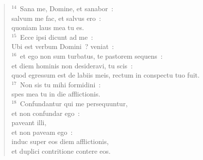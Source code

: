 \begin{flushleft}
\begin{verse}
${}^{14}$~Sana me, Domine, et sanabor~:\\ salvum me fac, et salvus ero~:\\ quoniam laus mea tu es.\\
${}^{15}$~Ecce ipsi dicunt ad me~:\\ Ubi est verbum Domini~? veniat~:\\
${}^{16}$~et ego non sum turbatus, te pastorem sequens~:\\ et diem hominis non desideravi, tu scis~:\\ quod egressum est de labiis meis, rectum in conspectu tuo fuit.\\
${}^{17}$~Non sis tu mihi formidini~:\\ spes mea tu in die afflictionis.\\
${}^{18}$~Confundantur qui me persequuntur,\\ et non confundar ego~:\\ paveant illi,\\ et non paveam ego~:\\ induc super eos diem afflictionis,\\ et duplici contritione contere eos.\end{verse}\end{flushleft}


